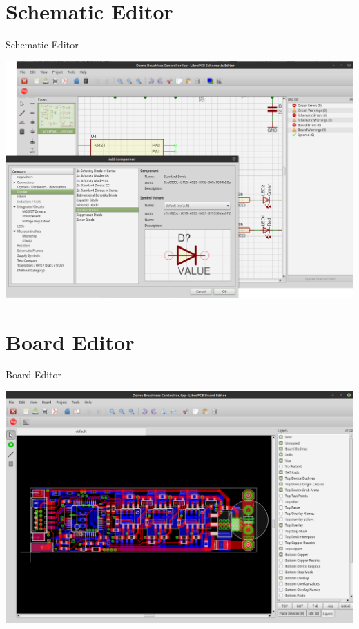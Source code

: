 \documentclass[aspectratio=1610,t]{beamer}
\begin{document}
\section{Schematic Editor}

\begin{frame}{Schematic Editor}
	\begin{center}
		\includegraphics[width=0.7\paperwidth]{images/schematic_editor.png}
	\end{center}
\end{frame}


\section{Board Editor}

\begin{frame}{Board Editor}
	\begin{center}
		\includegraphics[width=0.7\paperwidth]{images/board_editor.png}
	\end{center}
\end{frame}
\end{document}
